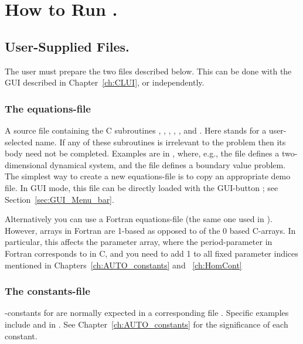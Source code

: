 
\chapter{ How to Run \AUTO.}  \label{ch:How_to_run_AUTO}
\section{ User-Supplied Files.} \label{sec: User_supplied_files}
The user must prepare the two files described below.
This can be done with the GUI described in Chapter~\ref{ch:CLUI}, 
or independently.

\subsection{ The equations-file } 
A source file  containing the C subroutines
, , , , , and .
Here  stands for a user-selected name. 
If any of these subroutines is irrelevant 
to the problem then its body need not be completed.
Examples are in , where, e.g.,
the file  defines a two-dimensional dynamical system,
and the file  defines a boundary value problem.
The simplest way to create a new equations-file is to copy 
an appropriate demo file.
In GUI mode, this file can be directly loaded with the GUI-button 
; see Section~\ref{sec:GUI_Menu_bar}.

Alternatively you can use a Fortran equations-file 
(the same one used in \AUTOold).
However, arrays in Fortran are 1-based as opposed to
of the 0 based C-arrays. In particular, this affects the parameter
array, where the period-parameter  in Fortran
corresponds to  in C, and you need to add 1 to all
fixed parameter indices mentioned in Chapters~\ref{ch:AUTO_constants}
and ~\ref{ch:HomCont}

\subsection{ The constants-file } 
\AUTO-constants for  are normally expected 
in a corresponding file .
Specific examples include 
and  in .
See Chapter~\ref{ch:AUTO_constants}
for the significance of each constant.

